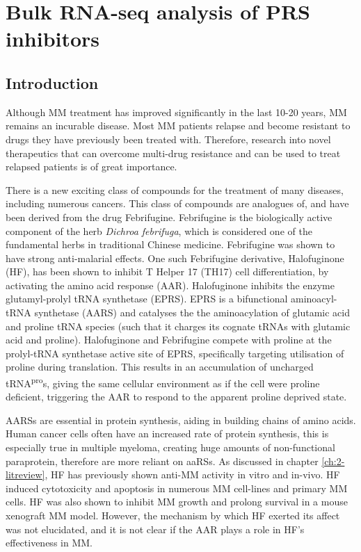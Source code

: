 \chapter{\label{ch:5-bulk}Bulk RNA-seq analysis of PRS inhibitors}


\section{Introduction}
Although MM treatment has improved significantly in the last 10-20 years, MM remains an incurable disease.
Most MM patients relapse and become resistant to drugs they have previously been treated with.
Therefore, research into novel therapeutics that can overcome multi-drug resistance and can be used to treat relapsed patients is of great importance.

There is a new exciting class of compounds for the treatment of many diseases, including numerous cancers.
This class of compounds are analogues of, and have been derived from the drug Febrifugine.
Febrifugine is the biologically active component of the herb \textit{Dichroa febrifuga}, which is considered one of the fundamental herbs in traditional Chinese medicine.
Febrifugine was shown to have strong anti-malarial effects.
One such Febrifugine derivative, Halofuginone (HF), has been shown to inhibit T Helper 17 (TH17) cell differentiation, by activating the amino acid response (AAR)\cite{sundrud2009halofuginone}.
Halofuginone inhibits the enzyme glutamyl-prolyl tRNA synthetase (EPRS).
EPRS is a bifunctional aminoacyl-tRNA synthetase (AARS) and catalyses the the aminoacylation of glutamic acid and proline tRNA species (such that it charges its cognate tRNAs with glutamic acid and proline).
Halofuginone and Febrifugine compete with proline at the prolyl-tRNA synthetase active site of EPRS, specifically targeting utilisation of proline during translation\cite{keller2012halofuginone}.
This results in an accumulation of uncharged tRNA\textsuperscript{pro}s, giving the same cellular environment as if the cell were proline deficient, triggering the AAR to respond to the apparent proline deprived state.

AARSs are essential in protein synthesis, aiding in building chains of amino acids.
Human cancer cells often have an increased rate of protein synthesis, this is especially true in multiple myeloma, creating huge amounts of non-functional paraprotein, therefore are more reliant on aaRSs.
As discussed in chapter \ref{ch:2-litreview}, HF has previously shown anti-MM activity in vitro and in-vivo.
HF induced cytotoxicity and apoptosis in numerous MM cell-lines and primary MM cells.
HF was also shown to inhibit MM growth and prolong survival in a mouse xenograft MM model.
However, the mechanism by which HF exerted its affect was not elucidated, and it is not clear if the AAR plays a role in HF's effectiveness in MM\@.

